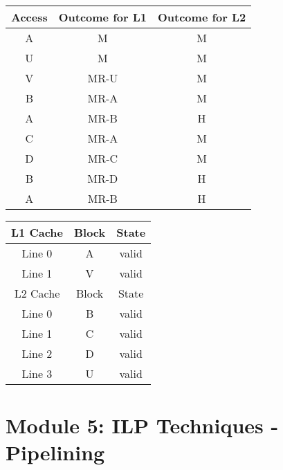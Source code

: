 \documentclass[12pt]{article}
\begin{document}
\begin{enumerate}
        \begin{tabular}[ht!]{|c|c|c|} \hline
            Access  & Outcome for L1    & Outcome for L2    \\ \hline
            A       & M                 & M                 \\ \hline
            U       & M                 & M                 \\ \hline
            V       & MR-U              & M                 \\ \hline
            B       & MR-A              & M                 \\ \hline
            A       & MR-B              & H                 \\ \hline
            C       & MR-A              & M                 \\ \hline
            D       & MR-C              & M                 \\ \hline
            B       & MR-D              & H                 \\ \hline
            A       & MR-B              & H                 \\ \hline            
        \end{tabular}

        \begin{tabular}[ht!]{|c|c|c|} \hline
            L1 Cache    & Block & State     \\ \hline
            Line 0      & A     & valid     \\ \hline
            Line 1      & V     & valid     \\ \hline
            L2 Cache    & Block & State     \\ \hline
            Line 0      & B     & valid     \\ \hline
            Line 1      & C     & valid     \\ \hline
            Line 2      & D     & valid     \\ \hline
            Line 3      & U     & valid     \\ \hline
        \end{tabular}
        
    \end{enumerate}

    \newpage

    \section{Module 5: ILP Techniques - Pipelining}
\end{document}
